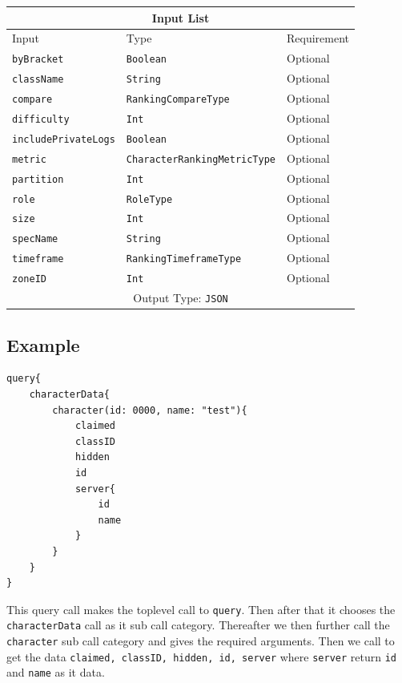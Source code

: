\documentclass[10pt, a4paper]{memoir}
\numberwithin{equation}{section}
\theoremstyle{plain}
\theoremstyle{defp}
\theoremstyle{dotless}
\theoremstyle{definition}
\theoremstyle{dotless}
\theoremstyle{dotless}
\theoremstyle{defp}
\theoremstyle{defp}
\theoremstyle{be}          %
\theoremstyle{defp}
\newcommand\ttt[1]{\texttt{#1}}
\begin{document}
\begin{table}[h!]
	\centering
	\begin{tabular}{ |p{4.2cm}|p{6cm}|p{3cm}|  }
		\hline
		\multicolumn{3}{|c|}{Input List} \\
		\hline
		Input & Type & Requirement\\
		\hline
		\ttt{byBracket} & \ttt{Boolean} & Optional\\
		\ttt{className} & \ttt{String} & Optional\\
		\ttt{compare} & \ttt{RankingCompareType} & Optional\\
		\ttt{difficulty} & \ttt{Int} & Optional\\
		\ttt{includePrivateLogs} & \ttt{Boolean} & Optional\\
		\ttt{metric} & \ttt{CharacterRankingMetricType} & Optional\\
		\ttt{partition} & \ttt{Int} & Optional\\
		\ttt{role} & \ttt{RoleType} & Optional\\
		\ttt{size} & \ttt{Int} & Optional\\
		\ttt{specName} & \ttt{String} & Optional\\
		\ttt{timeframe} & \ttt{RankingTimeframeType} & Optional\\
		\ttt{zoneID} & \ttt{Int} & Optional\\
		\hline
		\multicolumn{3}{|c|}{Output Type: \ttt{JSON}} \\
		\hline
	\end{tabular}
\end{table}

\newpage

\subsection{Example}

\begin{lstlisting}[language=WowAPI]
query{
	characterData{
		character(id: 0000, name: "test"){
			claimed
			classID
			hidden
			id
			server{
				id
				name
			}
		}
	}
}
\end{lstlisting}

This query call makes the toplevel call to \ttt{query}. Then after that it chooses the \ttt{characterData} call as it sub call category. Thereafter we then further call  the \ttt{character} sub call category and gives the required arguments. Then we call to get the data \ttt{claimed, classID, hidden, id, server} where \ttt{server} return \ttt{id} and \ttt{name} as it data.  
\end{document}

